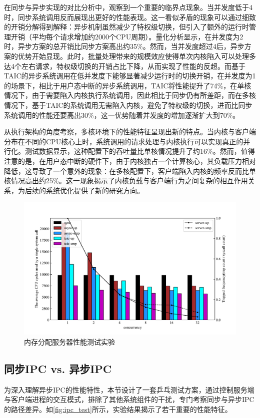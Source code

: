 在同步与异步实现的对比分析中，观察到一个重要的临界点现象。当并发度低于4时，同步系统调用反而展现出更好的性能表现。这一看似矛盾的现象可以通过细致的开销分解得到解释：异步机制虽然减少了特权级切换，但引入了额外的运行时管理开销（平均每个请求增加约2000个CPU周期）。量化分析显示，在并发度为2时，异步方案的总开销比同步方案高出约35\%。然而，当并发度超过4后，异步方案的优势开始显现。此时，批量处理带来的规模效应使得单次内核陷入可以处理多达4个左右请求，特权级切换的开销占比下降，从而实现了性能的反超。而基于TAIC的异步系统调用在低并发度下能够显著减少运行时的切换开销，在并发度为1的场景下，相比于用户态中断的异步系统调用，TAIC将性能提升了74\%，在单核情况下，由于需要陷入内核执行系统调用，因此相比于同步仍有所差距，而在多核情况下，基于TAIC的系统调用无需陷入内核，避免了特权级的切换，进而比同步系统调用的性能还要高出30\%，这一优势随着并发度的增加逐渐扩大到70\%。

从执行架构的角度考察，多核环境下的性能特征呈现出新的特点。当内核与客户端分布在不同的CPU核心上时，系统调用的请求处理与内核执行可以实现真正的并行化。测试数据显示，这种配置下的吞吐量比单核情况提升了约16\%。然而，值得注意的是，在用户态中断的硬件下，由于内核独占一个计算核心，其负载压力相对降低，这导致了一个意外的现象：在多核配置下，客户端陷入内核的频率反而比单核情况高出约25\%。这一现象揭示了内核负载与客户端行为之间复杂的相互作用关系，为后续的系统优化提供了新的研究方向。

\begin{figure}[htbp]
    \centering
    \includegraphics[width=1.0\textwidth]{figures/syscall_test.pdf}
    \caption{内存分配服务器性能测试实验}\label{fig:syscall_test}
\end{figure}

\subsection{同步IPC vs. 异步IPC}
为深入理解异步IPC的性能特性，本节设计了一套乒乓测试方案，通过控制服务端与客户端进程的交互模式，排除了其他系统组件的干扰，专门考察同步与异步IPC的路径差异。如\ref{fig:ipc_test}所示，实验结果揭示了若干重要的性能特征。

